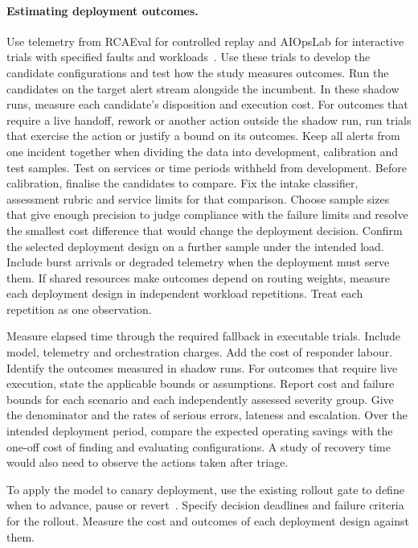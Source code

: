 \documentclass[11pt,reqno]{amsart}
\theoremstyle{definition}
\theoremstyle{remark}
\begin{document}
\paragraph{Estimating deployment outcomes.}
Use telemetry from RCAEval for controlled replay and AIOpsLab for interactive trials with specified faults and workloads~\cite{phamRcaEval2025,chenAiOpsLab2025}.
Use these trials to develop the candidate configurations and test how the study measures outcomes. Run the candidates on the target alert stream alongside the incumbent. In these shadow runs, measure each candidate's disposition and execution cost. For outcomes that require a live handoff, rework or another action outside the shadow run, run trials that exercise the action or justify a bound on its outcomes.
Keep all alerts from one incident together when dividing the data into development, calibration and test samples. Test on services or time periods withheld from development.
Before calibration, finalise the candidates to compare. Fix the intake classifier, assessment rubric and service limits for that comparison.
Choose sample sizes that give enough precision to judge compliance with the failure limits and resolve the smallest cost difference that would change the deployment decision.
Confirm the selected deployment design on a further sample under the intended load. Include burst arrivals or degraded telemetry when the deployment must serve them.
If shared resources make outcomes depend on routing weights, measure each deployment design in independent workload repetitions. Treat each repetition as one observation.

Measure elapsed time through the required fallback in executable trials.
Include model, telemetry and orchestration charges. Add the cost of responder labour.
Identify the outcomes measured in shadow runs. For outcomes that require live execution, state the applicable bounds or assumptions.
Report cost and failure bounds for each scenario and each independently assessed severity group. Give the denominator and the rates of serious errors, lateness and escalation.
Over the intended deployment period, compare the expected operating savings with the one-off cost of finding and evaluating configurations.
A study of recovery time would also need to observe the actions taken after triage.

To apply the model to canary deployment, use the existing rollout gate to define when to advance, pause or revert~\cite{sreCanarying2018}. Specify decision deadlines and failure criteria for the rollout. Measure the cost and outcomes of each deployment design against them.
\end{document}
